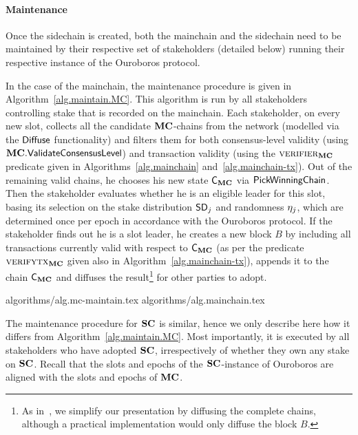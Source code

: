 
\paragraph{Maintenance}

Once the sidechain is created, both the mainchain and the sidechain need to be
maintained by their respective set of stakeholders (detailed below) running
their respective instance of the Ouroboros protocol.

In the case of the mainchain, the maintenance procedure is given
in Algorithm~\ref{alg.maintain.MC}.
This algorithm is run by all stakeholders controlling stake that is recorded on
the mainchain. Each stakeholder, on every new slot, collects all the candidate
$\mathbf{MC}$-chains from the network (modelled via the $\mathsf{Diffuse}$ functionality) and
filters them for both consensus-level validity (using $\mathbf{MC}.\mathsf{ValidateConsensusLevel}$) and
transaction validity (using the $\textsc{verifier}_{\mathbf{MC}}$ predicate given in
Algorithms~\ref{alg.mainchain} and~\ref{alg.mainchain-tx}). Out of the remaining valid chains, he chooses
his new state $\mathsf{C}_{\mathbf{MC}}$ via $\mathsf{PickWinningChain}$. Then the stakeholder
evaluates whether he is an eligible leader for this slot, basing its selection
on the stake distribution $\mathsf{SD}_j$ and randomness $\eta_j$, which are determined
once per epoch
in accordance with the Ouroboros protocol.
If the stakeholder finds out he is a slot leader, he creates a new block $B$ by
including all transactions currently valid with respect to $\mathsf{C}_{\mathbf{MC}}$
(as per the predicate $\textsc{verifytx}_{\mathbf{MC}}$ given also in Algorithm~\ref{alg.mainchain-tx}),
appends it to the chain $\mathsf{C}_{\mathbf{MC}}$ and diffuses the result\footnote{
As in~\cite{ouroboros,praos}, we simplify our
presentation by diffusing the complete chains,
although a practical implementation would only diffuse the block $B$.}
for other parties to adopt.

{algorithms/alg.mc-maintain.tex}
{algorithms/alg.mainchain.tex}

The maintenance procedure for $\mathbf{SC}$ is similar, hence we only
describe here how it differs from Algorithm~\ref{alg.maintain.MC}. Most
importantly, it is executed by all stakeholders who have adopted $\mathbf{SC}$,
irrespectively of whether they own any stake on $\mathbf{SC}$.
Recall that the slots and epochs of the $\mathbf{SC}$-instance of Ouroboros are aligned
with the slots and epochs of $\mathbf{MC}$.

